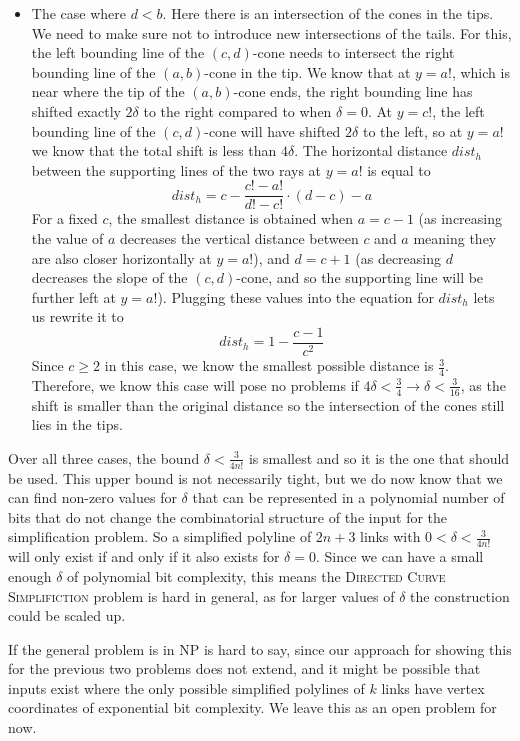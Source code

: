 \documentclass[]{llncs}
\begin{document}
\begin{itemize}
\item The case where  \(d < b\). Here there is an intersection of the cones in the tips. We need to make sure not to introduce new intersections of the tails. For this, the left bounding line of the \((c,d)\)-cone needs to intersect the right bounding line of the \((a,b)\)-cone in the tip. We know that at \(y = a!\), which is near where the tip of the \((a,b)\)-cone ends, the right bounding line has shifted exactly \(2\delta\) to the right compared to when \(\delta=0\). At \(y = c!\), the left bounding line of the \((c,d)\)-cone will have shifted \(2\delta\) to the left, so at \(y = a!\) we know that the total shift is less than \(4\delta\). The horizontal distance \(dist_h\) between the supporting lines of the two rays at \(y=a!\) is equal to \[dist_h = c - \frac{c!-a!}{d!-c!}\cdot(d-c) - a\] For a fixed \(c\), the smallest distance is obtained when \(a = c-1\) (as increasing the value of \(a\) decreases the vertical distance between \(c\) and \(a\) meaning they are also closer horizontally at \(y = a!\)), and \(d = c+1\) (as decreasing \(d\) decreases the slope of the \((c,d)\)-cone, and so the supporting line will be further left at \(y=a!\)). Plugging these values into the equation for \(dist_h\) lets us rewrite it to \[dist_h = 1 - \frac{c-1}{c^2}\] Since \(c\ge2\) in this case, we know the smallest possible distance is \(\frac{3}{4}\). Therefore, we know this case will pose no problems if \(4\delta < \frac{3}{4} \rightarrow \delta < \frac{3}{16}\), as the shift is smaller than the original distance so the intersection of the cones still lies in the tips.
\end{itemize}

Over all three cases, the bound \(\delta < \frac{3}{4n!}\) is smallest and so it is the one that should be used. 
This upper bound is not necessarily tight, but we do now know that we can find non-zero values for \(\delta\) that can be represented in a polynomial number of bits that do not change the combinatorial structure of the input for the simplification problem. So a simplified polyline of $2n+3$ links with \(0 < \delta < \frac{3}{4n!}\) will only exist if and only if it also exists for \(\delta = 0\).
Since we can have a small enough \(\delta\) of polynomial bit complexity, this means the \textsc{Directed Curve Simplifiction} problem is hard in general, as for larger values of \(\delta\) the construction could be scaled up.  

If the general problem is in NP is hard to say, since our approach for showing this for the previous two problems does not extend, and it might be possible that inputs exist where the only possible simplified polylines of $k$ links have vertex coordinates of exponential bit complexity. We leave this as an open problem for now.
 
\end{document}
